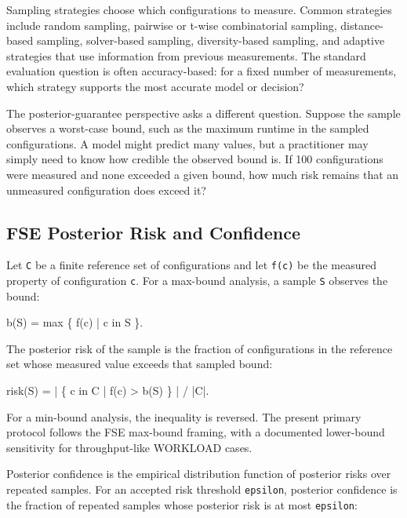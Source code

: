 \documentclass[smallcondensed]{svjour3}
\newenvironment{Shaded}{}{}
\newcommand{\NormalTok}[1]{#1}
\begin{document}
Sampling strategies choose which configurations to measure. Common
strategies include random sampling, pairwise or t-wise combinatorial
sampling, distance-based sampling, solver-based sampling,
diversity-based sampling, and adaptive strategies that use information
from previous measurements. The standard evaluation question is often
accuracy-based: for a fixed number of measurements, which strategy
supports the most accurate model or decision?

The posterior-guarantee perspective asks a different question. Suppose
the sample observes a worst-case bound, such as the maximum runtime in
the sampled configurations. A model might predict many values, but a
practitioner may simply need to know how credible the observed bound is.
If 100 configurations were measured and none exceeded a given bound, how
much risk remains that an unmeasured configuration does exceed it?

\subsection{FSE Posterior Risk and
Confidence}\label{fse-posterior-risk-and-confidence}

Let \texttt{C} be a finite reference set of configurations and let
\texttt{f(c)} be the measured property of configuration \texttt{c}. For
a max-bound analysis, a sample \texttt{S} observes the bound:

\begin{Shaded}
\begin{Highlighting}[]
\NormalTok{b(S) = max \{ f(c) | c in S \}.}
\end{Highlighting}
\end{Shaded}

The posterior risk of the sample is the fraction of configurations in
the reference set whose measured value exceeds that sampled bound:

\begin{Shaded}
\begin{Highlighting}[]
\NormalTok{risk(S) = | \{ c in C | f(c) \textgreater{} b(S) \} | / |C|.}
\end{Highlighting}
\end{Shaded}

For a min-bound analysis, the inequality is reversed. The present
primary protocol follows the FSE max-bound framing, with a documented
lower-bound sensitivity for throughput-like WORKLOAD cases.

Posterior confidence is the empirical distribution function of posterior
risks over repeated samples. For an accepted risk threshold
\texttt{epsilon}, posterior confidence is the fraction of repeated
samples whose posterior risk is at most \texttt{epsilon}:
\end{document}
